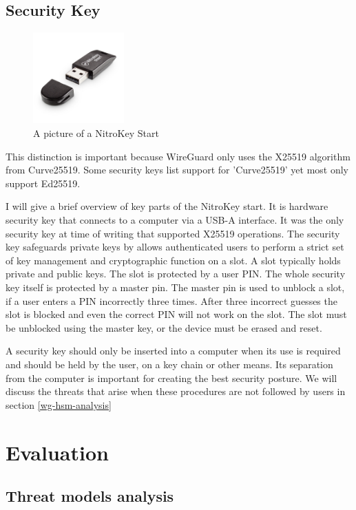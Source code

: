 \documentclass [11pt, proquest] {uwthesis}[2020/02/24]
\begin{document}
\section{Security Key}
\begin{figure}[ht]
\includegraphics[width=3.5cm]{paper/images/nitrokey.jpg}
\caption{A picture of a NitroKey Start}
\label{nitrokey}
\end{figure}

This distinction is important because WireGuard only uses the X25519 algorithm from Curve25519. Some security keys list support for 'Curve25519' yet most only support Ed25519.

I will give a brief overview of key parts of the NitroKey start. It is hardware security key that connects to a computer via a USB-A interface. It was the only security key at time of writing that supported X25519 operations.
The security key safeguards private keys by allows authenticated users to perform a strict set of key management and cryptographic function on a slot. A slot typically holds private and public keys. The slot is protected by a user PIN. The whole security key itself is protected by a master pin. The master pin is used to unblock a slot, if a user enters a PIN incorrectly three times. After three incorrect guesses the slot is blocked and even the correct PIN will not work on the slot. The slot must be unblocked using the master key, or the device must be erased and reset.

A security key should only be inserted into a computer when its use is required and should be held by the user, on a key chain or other means. Its separation from the computer is important for creating the best security posture. We will discuss the threats that arise when these procedures are not followed by users in section \ref{wg-hsm-analysis}

\chapter {Evaluation}
\section{Threat models analysis}
\end{document}
